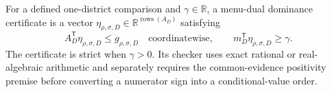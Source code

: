 For a defined one-district comparison and \(\gamma\in\mathbb R\), a menu-dual dominance certificate is a vector \(\eta_{\rho,\sigma,D}\in\mathbb R^{\operatorname{rows}(A_D)}\) satisfying
\[
A_D^{\mathsf T}\eta_{\rho,\sigma,D}\leq g_{\rho,\sigma,D}
\quad\text{coordinatewise},
\qquad
m_D^{\mathsf T}\eta_{\rho,\sigma,D}\geq\gamma.
\]
The certificate is strict when \(\gamma>0\).  Its checker uses exact rational or real-algebraic arithmetic and separately requires the common-evidence positivity premise before converting a numerator sign into a conditional-value order.